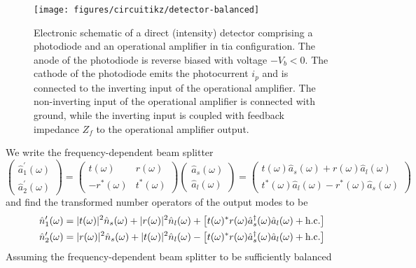 \begin{figure}[htb]
    \centering
    \texttt{[image: figures/circuitikz/detector-balanced]}
    \caption{Electronic schematic of a direct (intensity) detector comprising a photodiode and an operational amplifier in \gls{tia} configuration. The anode of the photodiode is reverse biased with voltage $-V_b<0$. The cathode of the photodiode emits the photocurrent $i_p$ and is connected to the inverting input of the operational amplifier. The non-inverting input of the operational amplifier is connected with ground, while the inverting input is coupled with feedback impedance $Z_f$ to the operational amplifier output.}\label{fig:detector_balanced_electronics}
\end{figure}

We write the frequency-dependent beam splitter \cite[p.~207]{Vogel2006}
\begin{equation}
	\begin{pmatrix}
		\hat{a}_1^\prime(\omega) \\
		\hat{a}_2^\prime(\omega)
	\end{pmatrix}
	=
	\begin{pmatrix}
		t(\omega) & r(\omega) \\
		-r^*(\omega) & t^*(\omega)
	\end{pmatrix}
	\begin{pmatrix}
		\hat{a}_s(\omega) \\
		\hat{a}_l(\omega)
	\end{pmatrix}
	=
	\begin{pmatrix}
		t(\omega)\hat{a}_s(\omega) + r(\omega)\hat{a}_l(\omega) \\
		t^*(\omega)\hat{a}_l(\omega) - r^*(\omega)\hat{a}_s(\omega)
	\end{pmatrix}
\end{equation}
and find the transformed number operators of the output modes to be
\begin{align}
	\hat{n}_1^\prime(\omega)
	&=
	\lvert t(\omega)\rvert^2
	\hat{n}_s(\omega)
	+
	\lvert r(\omega)\rvert^2
	\hat{n}_l(\omega)
	+
	\left[
		t(\omega)^*
		r(\omega)
		\hat{a}_s^\dagger(\omega)
		\hat{a}_l(\omega)
		+
		\text{h.c.}
	\right]
	\\
	\hat{n}_2^\prime(\omega)
	&=
	\lvert r(\omega)\rvert^2
	\hat{n}_s(\omega)
	+
	\lvert t(\omega)\rvert^2
	\hat{n}_l(\omega)
	-
	\left[
		t(\omega)^*
		r(\omega)
		\hat{a}_s^\dagger(\omega)
		\hat{a}_l(\omega)
		+
		\text{h.c.}
	\right]
\end{align}
Assuming the frequency-dependent beam splitter to be sufficiently balanced
